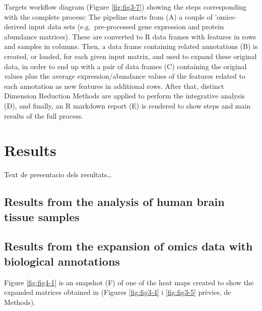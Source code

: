 \documentclass[a4paper, nobind]{templates/ociamthesis}
\renewcommand{\chaptermark}[1]{\markboth{\thechapter. #1}{\thechapter. #1}}
\begin{document}
Targets workflow diagram (Figure \ref{fig:fig3-7}) showing the steps corresponding with the complete process: The pipeline starts from (A) a couple of 'omics-derived input data sets (e.g.~pre-processed gene expression and protein abundance matrices). These are converted to R data frames with features in rows and samples in columns. Then, a data frame containing related annotations (B) is created, or loaded, for each given input matrix, and used to expand these original data, in order to end up with a pair of data frames (C) containing the original values plus the average expression/abundance values of the features related to each annotation as new features in additional rows. After that, distinct Dimension Reduction Methods are applied to perform the integrative analysis (D), and finally, an R markdown report (E) is rendered to show steps and main results of the full process.

\hypertarget{results}{%
\chapter{Results}\label{results}}

\chaptermark{Results}

\minitoc 

Text de presentacio dels resultats\ldots{}

\hypertarget{results-from-the-analysis-of-human-brain-tissue-samples}{%
\section{Results from the analysis of human brain tissue samples}\label{results-from-the-analysis-of-human-brain-tissue-samples}}

\hypertarget{results-from-the-expansion-of-omics-data-with-biological-annotations}{%
\section{Results from the expansion of omics data with biological annotations}\label{results-from-the-expansion-of-omics-data-with-biological-annotations}}

Figure \ref{fig:fig4-1} is an snapshot (F) of one of the heat maps created to show the expanded matrices obtained in (Figures \ref{fig:fig3-4} i \ref{fig:fig3-5} prèvies, de Methods).
\end{document}
